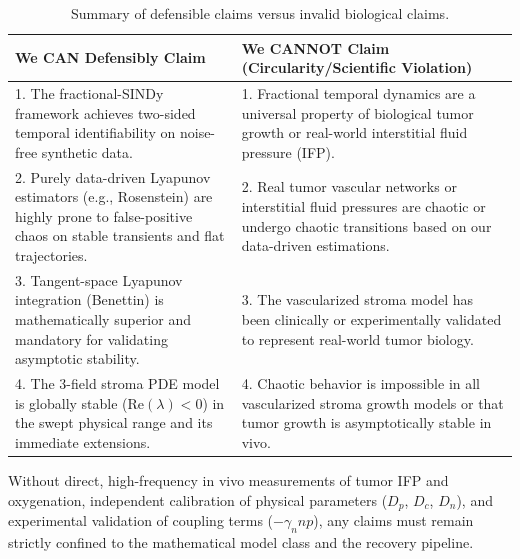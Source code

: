 \documentclass[review,3p,times]{elsarticle}
\begin{document}
\begin{table}[htbp]
\centering
\caption{Summary of defensible claims versus invalid biological claims.}
\label{tab:claims}
\begin{tabular}{p{7.5cm}p{7.5cm}}
\toprule
We CAN Defensibly Claim & We CANNOT Claim (Circularity/Scientific Violation) \\
\midrule
1. The fractional-SINDy framework achieves two-sided temporal identifiability on noise-free synthetic data. & 1. Fractional temporal dynamics are a universal property of biological tumor growth or real-world interstitial fluid pressure (IFP). \\
2. Purely data-driven Lyapunov estimators (e.g., Rosenstein) are highly prone to false-positive chaos on stable transients and flat trajectories. & 2. Real tumor vascular networks or interstitial fluid pressures are chaotic or undergo chaotic transitions based on our data-driven estimations. \\
3. Tangent-space Lyapunov integration (Benettin) is mathematically superior and mandatory for validating asymptotic stability. & 3. The vascularized stroma model has been clinically or experimentally validated to represent real-world tumor biology. \\
4. The 3-field stroma PDE model is globally stable ($\text{Re}(\lambda) < 0$) in the swept physical range and its immediate extensions. & 4. Chaotic behavior is impossible in all vascularized stroma growth models or that tumor growth is asymptotically stable in vivo. \\
\bottomrule
\end{tabular}
\end{table}

Without direct, high-frequency in vivo measurements of tumor IFP and oxygenation, independent calibration of physical parameters ($D_p$, $D_c$, $D_n$), and experimental validation of coupling terms ($-\gamma_n n p$), any claims must remain strictly confined to the mathematical model class and the recovery pipeline.
\end{document}
